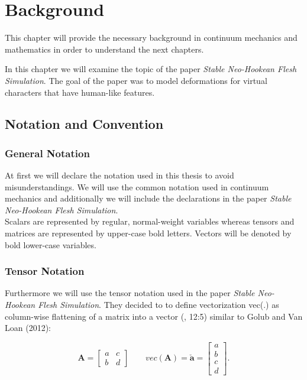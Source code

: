 \chapter{Background} \label{c:Background}
This chapter will provide the necessary background in continuum mechanics and mathematics in order to understand the next chapters.

In this chapter we will examine the topic of the paper \textit{Stable Neo-Hookean Flesh Simulation}. The goal of the paper was to model deformations for virtual characters that have human-like features.


\section{Notation and Convention}

\subsection{General Notation}
At first we will declare the notation used in this thesis to avoid misunderstandings. We will use the common notation used in continuum mechanics and additionally we will include the declarations in the paper \textit{Stable Neo-Hookean Flesh Simulation}. 
\\
Scalars are represented by regular, normal-weight variables whereas 
tensors and matrices are represented by upper-case bold letters. Vectors will be denoted by bold lower-case variables.


\subsection{Tensor Notation}

Furthermore we will use the tensor notation used in the paper \textit{Stable Neo-Hookean Flesh Simulation}. They decided to to define vectorization vec(.) as column-wise flattening of a matrix into a vector (\cite{Smith:2018:SNF:3191713.3180491}, 12:5) similar to Golub and Van Loan (2012):

\[
\textbf{A} = \begin{bmatrix} a & c \\ b & d \end{bmatrix} \qquad vec(\textbf{A}) = \boldsymbol{\check{a}} = \begin{bmatrix} a \\ b \\ c \\ d \end{bmatrix}.
\]

